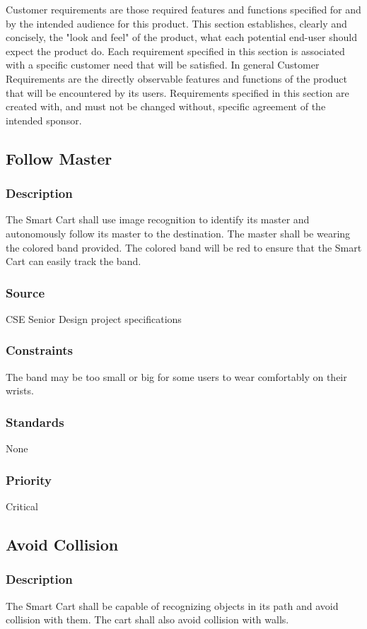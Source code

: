 Customer requirements are those required features and functions specified for and by the intended audience for this product. This section establishes, clearly and concisely, the "look and feel" of the product, what each potential end-user should expect the product do. Each requirement specified in this section is associated with a specific customer need that will be satisfied. In general Customer Requirements are the directly observable features and functions of the product that will be encountered by its users. Requirements specified in this section are created with, and must not be changed without, specific agreement of the intended sponsor.

\subsection{Follow Master}
\subsubsection{Description}
The Smart Cart shall use image recognition to identify its master and autonomously follow its master to the destination. The master shall be wearing the colored band provided. The colored band will be red to ensure that the Smart Cart can easily track the band.
\subsubsection{Source}
CSE Senior Design project specifications
\subsubsection{Constraints}
The band may be too small or big for some users to wear comfortably on their wrists. 
\subsubsection{Standards}
None
\subsubsection{Priority}
Critical


\subsection{Avoid Collision}
\subsubsection{Description}
The Smart Cart shall be capable of recognizing objects in its path and avoid collision with them. The cart shall also avoid collision with walls.
